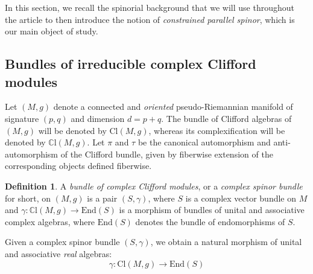 \documentclass[10pt,a4paper,twoside,reqno]{amsart}
\theoremstyle{plain}
\theoremstyle{definition}
\newtheorem{definition}[thm]{Definition}
\theoremstyle{remark}
\newcommand{\End}{\mathrm{End}}
\def\mCl{\mathbb{C}\mathrm{l}}
\begin{document}

In this section, we recall the spinorial background that we will use throughout the article to then introduce the notion of \emph{constrained parallel spinor}, which is our main object of study.


\subsection{Bundles of irreducible complex Clifford modules}


Let $(M,g)$ denote a connected and \emph{oriented} pseudo-Riemannian manifold of signature $(p,q)$ and dimension $d=p+q$. The bundle of Clifford algebras of $(M,g)$ will be denoted by $\mathrm{Cl}(M,g)$, whereas its complexification will be denoted by $\mCl(M,g)$. Let $\pi$ and $\tau$ be the canonical automorphism and anti-automorphism of the Clifford bundle, given by fiberwise extension of the corresponding objects defined fiberwise.

\begin{definition}
A \emph{bundle of complex Clifford modules}, or a \emph{complex spinor bundle} for short, on $(M,g)$ is a pair $(S,\gamma)$, where $S$ is a complex vector bundle on $M$ and $\gamma\colon\mCl(M,g)\to\End(S)$ is a morphism of bundles of unital and associative complex algebras, where $\End(S)$ denotes the bundle of endomorphisms of $S$.
\end{definition}

Given a complex spinor bundle $(S,\gamma)$, we obtain a natural morphism of unital and associative \emph{real} algebras:
\begin{equation*}
\gamma \colon \mathrm{Cl}(M,g) \to \End(S)
\end{equation*}
\end{document}

